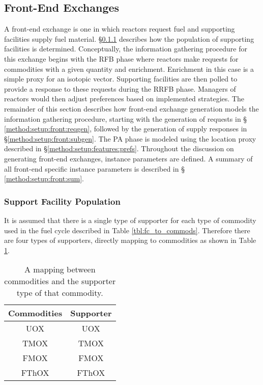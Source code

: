 \subsection{Front-End Exchanges}\label{method:setup:front}

A front-end exchange is one in which reactors request fuel and supporting
facilities supply fuel material. \S \ref{method:setup:front:sup} describes how
the population of supporting facilities is determined. Conceptually, the
information gathering procedure for this exchange begins with the RFB phase
where reactors make requests for commodities with a given quantity and
enrichment. Enrichment in this case is a simple proxy for an isotopic
vector. Supporting facilities are then polled to provide a response to these
requests during the RRFB phase. Managers of reactors would then adjust
preferences based on implemented strategies. The remainder of this section
describes how front-end exchange generation models the information gathering
procedure, starting with the generation of requests in \S
\ref{method:setup:front:reqgen}, followed by the generation of supply responses
in \S \ref{method:setup:front:subgen}. The PA phase is modeled using the
location proxy described in \S \ref{method:setup:features:prefs}. Throughout the
discussion on generating front-end exchanges, instance parameters are defined. A
summary of all front-end specific instance parameters is described in \S
\ref{method:setup:front:sum}.

\subsubsection{Support Facility Population} \label{method:setup:front:sup}

It is assumed that there is a single type of supporter for each type of commodity
used in the fuel cycle described in Table \ref{tbl:fc_to_commods}. Therefore
there are four types of supporters, directly mapping to commodities as shown in
Table \ref{tbl:commod_to_sup}.

\begin{table}[h]
\centering
\caption{A mapping between commodities and the supporter type of that commodity.}
\label{tbl:commod_to_sup}
\begin{tabular}{|c|c|}
\hline
Commodities            & Supporter \\ \hline
UOX                    & UOX         \\ \hline
TMOX                    & TMOX         \\ \hline
FMOX                    & FMOX         \\ \hline
FThOX                    & FThOX         \\ \hline
\end{tabular}
\end{table}

